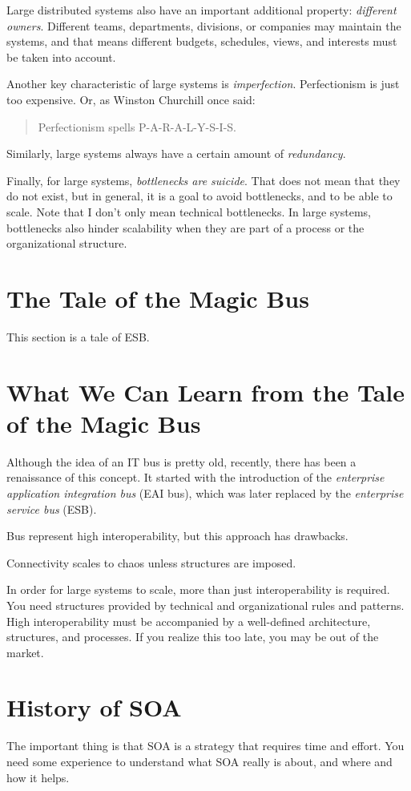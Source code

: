 \documentclass[11pt]{report}
\begin{document}
Large distributed systems also have an important additional property: \textit{different owners}. Different teams, departments, divisions, or companies may maintain the systems, and that means different budgets, schedules, views, and interests must be taken into account.

Another key characteristic of large systems is \textit{imperfection}. Perfectionism is just too expensive. Or, as Winston Churchill once said: 
\begin{quote}
Perfectionism spells P-A-R-A-L-Y-S-I-S.
\end{quote}

Similarly, large systems always have a certain amount of \textit{redundancy}.

Finally, for large systems, \textit{bottlenecks are suicide}. That does not mean that they do not exist, but in general, it is a goal to avoid bottlenecks, and to be able to scale. Note that I don't only mean technical bottlenecks. In large systems, bottlenecks also hinder scalability when they are part of a process or the organizational structure.

\section{The Tale of the Magic Bus}
This section is a tale of ESB.

\section{What We Can Learn from the Tale of the Magic Bus}
Although the idea of an IT bus is pretty old, recently, there has been a renaissance of this concept. It started with the introduction of the \textit{enterprise application integration bus} (EAI bus), which was later replaced by the \textit{enterprise service bus} (ESB).

Bus represent high interoperability, but this approach has drawbacks.

Connectivity scales to chaos unless structures are imposed.

In order for large systems to scale, more than just interoperability is required. You need structures provided by technical and organizational rules and patterns. High interoperability must be accompanied by a well-defined architecture, structures, and processes. If you realize this too late, you may be out of the market.

\section{History of SOA}
The important thing is that SOA is a strategy that requires time and effort. You need some experience to understand what SOA really is about, and where and how it helps.
\end{document}

